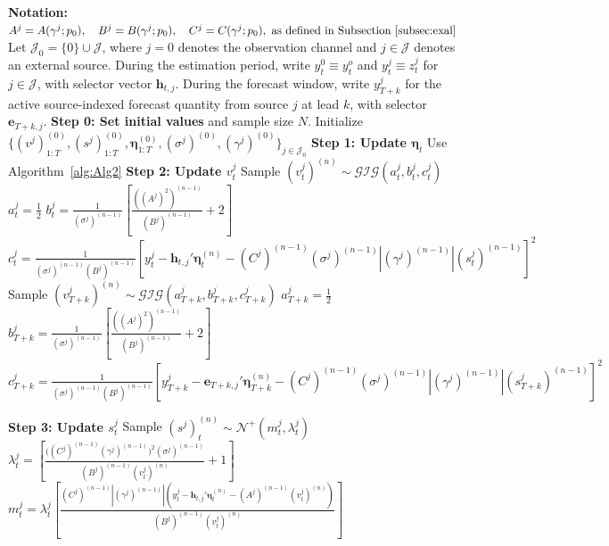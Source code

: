 \documentclass[APA,STIX1COL]{WileyNJD-v2}
\begin{document}
\begin{algorithm}
\caption{MCMC Algorithm}\label{alg1}
\begin{algorithmic}

\State \textbf{Notation:}
\State  \(
A^j = A(\gamma^j;p_0), \quad B^j = B(\gamma^j;p_0), \quad C^j = C(\gamma^j;p_0), \text{ as defined in Subsection~\ref{subsec:exal}}
\)
\State Let \(\mathcal{J}_0=\{0\}\cup\mathcal{J}\), where \(j=0\) denotes the observation channel and \(j\in\mathcal{J}\) denotes an external source. During the estimation period, write \(y_t^0 \equiv y_t^o\) and \(y_t^j \equiv z_t^j\) for \(j\in\mathcal{J}\), with selector vector \(\mathbf{h}_{t,j}\). During the forecast window, write \(y_{T+k}^{j}\) for the active source-indexed forecast quantity from source \(j\) at lead \(k\), with selector \(\mathbf{e}_{T+k,j}\).
\State \textbf{Step 0: Set initial values} and sample size $N$.
\State Initialize $\{(v^j)^{(0)}_{1:T}, (s^j)^{(0)}_{1:T}, \boldsymbol{\eta}^{(0)}_{1:T}, (\sigma^j)^{(0)}, (\gamma^j)^{(0)}\}_{j\in\mathcal{J}_0}$
    \State \textbf{Step 1: Update $\boldsymbol{\eta}_t$}
    \State Use Algorithm~\ref{alg:Alg2}
        \State \textbf{Step 2: Update $v^j_t$}
            \State Sample $(v^j_t)^{(n)} \sim \mathcal{GIG}(a^j_t, b^j_t, c^j_t)$
            \State $a^j_t = \frac{1}{2}$
            \State $b^j_t = \frac{1}{(\sigma^j)^{(n-1)}}\left[ \frac{((A^j)^2)^{(n-1)}}{(B^j)^{(n-1)}}+2\right]$
            \State $c^j_t = \frac{1}{(\sigma^j)^{(n-1)} (B^j)^{(n-1)}}\left[y_t^j -\textbf{h}_{t,j}' \boldsymbol{\eta}^{(n)}_t -(C^j)^{(n-1)} (\sigma^j)^{(n-1)} |(\gamma^j)^{(n-1)}| (s^j_t)^{(n-1)} \right]^2$
        \EndFor
            \State Sample $(v^j_{T+k})^{(n)} \sim \mathcal{GIG}(a^j_{T+k}, b^j_{T+k}, c^j_{T+k})$
            \State $a^j_{T+k} = \frac{1}{2}$
            \State $b^j_{T+k} = \frac{1}{(\sigma^j)^{(n-1)}}\left[ \frac{((A^j)^2)^{(n-1)}}{(B^j)^{(n-1)}}+2\right]$
            \State $c^j_{T+k} = \frac{1}{(\sigma^j)^{(n-1)} (B^j)^{(n-1)}}\left[y_{T+k}^j -\mathbf{e}_{T+k,j}' \boldsymbol{\eta}^{(n)}_{T+k} -(C^j)^{(n-1)} (\sigma^j)^{(n-1)} |(\gamma^j)^{(n-1)}| (s^j_{T+k})^{(n-1)} \right]^2$
        \EndFor
        \EndIf

        \State \textbf{Step 3: Update $s^j_t$}
            \State Sample $(s^j)^{(n)}_t \sim \mathcal{N}^+(m^j_t, \lambda^j_t)$
            \State $\lambda^j_t =  \left[\frac{\big((C^j)^{(n-1)}(\gamma^j)^{(n-1)} \big)^2(\sigma^j)^{(n-1)}}{(B^j)^{(n-1)}(v^j_t)^{(n)}}+1\right]$
            \State $m^j_t =  \lambda^j_t \left[\frac{(C^j)^{(n-1)}|(\gamma^j)^{(n-1)}|(y_t^j -\textbf{h}_{t,j}' \boldsymbol{\eta}^{(n)}_t - (A^j)^{(n-1)} (v^j_t)^{(n)})}{(B^j)^{(n-1)}(v^j_t)^{(n)}}\right]$
        \EndFor


\end{algorithmic}
\end{algorithm}
\end{document}
